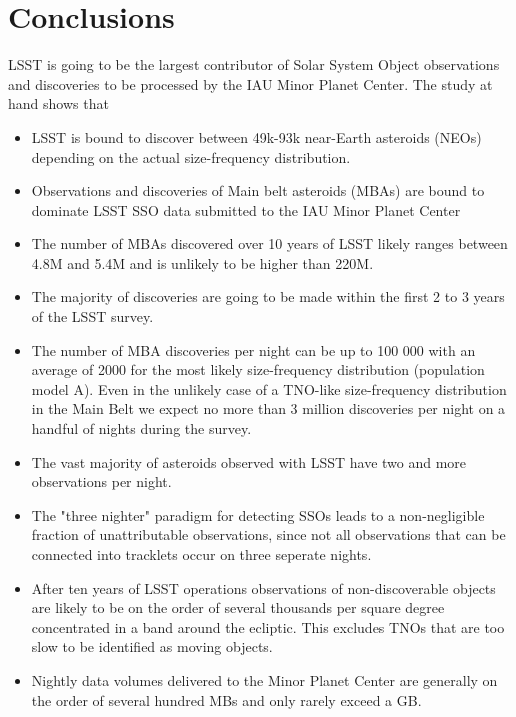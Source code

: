 \section{Conclusions} \label{sec:conclusions}

LSST is going to be the largest contributor of Solar System Object observations and discoveries to be processed by the IAU Minor Planet Center.
The study at hand shows that
\begin{itemize}
\item LSST is bound to discover between 49k-93k near-Earth asteroids (NEOs) depending on the actual size-frequency distribution.
\item Observations and discoveries of Main belt asteroids (MBAs) are bound to dominate LSST SSO data submitted to the IAU Minor Planet Center
\item The number of MBAs discovered over 10 years of LSST likely ranges between 4.8M and 5.4M and is unlikely to be higher than 220M. 
\item The majority of discoveries are going to be made within the first 2 to 3 years of the LSST survey.
\item The number of MBA discoveries per night can be up to 100 000 with an average of 2000 for the most likely size-frequency distribution (population model A). Even in the unlikely case of a TNO-like size-frequency distribution in the Main Belt we expect no more than 3 million discoveries per night on a handful of nights during the survey.
\item The vast majority of asteroids observed with LSST have two and more observations per night.  
\item The "three nighter" paradigm for detecting SSOs leads to a non-negligible fraction of unattributable observations, since not all observations that can be connected into tracklets occur on three seperate nights. 
\item After ten years of LSST operations observations of non-discoverable objects are likely to be on the order of several thousands per square degree concentrated in a band around the ecliptic. This excludes TNOs that are too slow to be identified as moving objects. 
\item Nightly data volumes delivered to the Minor Planet Center are generally on the order of several hundred MBs and only rarely exceed a GB.
\end{itemize}

%

